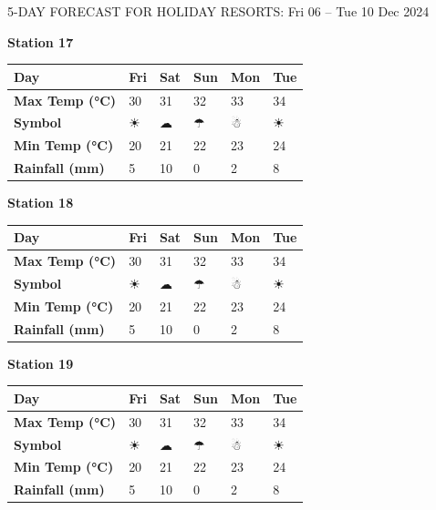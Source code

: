     \begin{frame}{5-DAY FORECAST FOR HOLIDAY RESORTS: Fri 06 – Tue 10 Dec 2024}
    \scriptsize
    
        \textbf{Station 17} \\
        \renewcommand{\arraystretch}{1.2} %
        \begin{tabular}{|p{2cm}|p{1.8cm}|p{1.8cm}|p{1.8cm}|p{1.8cm}|p{1.8cm}|}
        \hline
        \textbf{Day} & Fri & Sat & Sun & Mon & Tue \\ \hline
\textbf{Max Temp (°C)} & 30 & 31 & 32 & 33 & 34 \\ \hline
\textbf{Symbol} & ☀ & ☁ & ☂ & ☃ & ☀ \\ \hline
\textbf{Min Temp (°C)} & 20 & 21 & 22 & 23 & 24 \\ \hline
\textbf{Rainfall (mm)} & 5 & 10 & 0 & 2 & 8 \\ \hline
        \end{tabular}
        \vspace{0.5cm} %
        
        \textbf{Station 18} \\
        \renewcommand{\arraystretch}{1.2} %
        \begin{tabular}{|p{2cm}|p{1.8cm}|p{1.8cm}|p{1.8cm}|p{1.8cm}|p{1.8cm}|}
        \hline
        \textbf{Day} & Fri & Sat & Sun & Mon & Tue \\ \hline
\textbf{Max Temp (°C)} & 30 & 31 & 32 & 33 & 34 \\ \hline
\textbf{Symbol} & ☀ & ☁ & ☂ & ☃ & ☀ \\ \hline
\textbf{Min Temp (°C)} & 20 & 21 & 22 & 23 & 24 \\ \hline
\textbf{Rainfall (mm)} & 5 & 10 & 0 & 2 & 8 \\ \hline
        \end{tabular}
        \vspace{0.5cm} %
        
        \textbf{Station 19} \\
        \renewcommand{\arraystretch}{1.2} %
        \begin{tabular}{|p{2cm}|p{1.8cm}|p{1.8cm}|p{1.8cm}|p{1.8cm}|p{1.8cm}|}
        \hline
        \textbf{Day} & Fri & Sat & Sun & Mon & Tue \\ \hline
\textbf{Max Temp (°C)} & 30 & 31 & 32 & 33 & 34 \\ \hline
\textbf{Symbol} & ☀ & ☁ & ☂ & ☃ & ☀ \\ \hline
\textbf{Min Temp (°C)} & 20 & 21 & 22 & 23 & 24 \\ \hline
\textbf{Rainfall (mm)} & 5 & 10 & 0 & 2 & 8 \\ \hline
        \end{tabular}
        \vspace{0.5cm} %
        

\end{frame}
